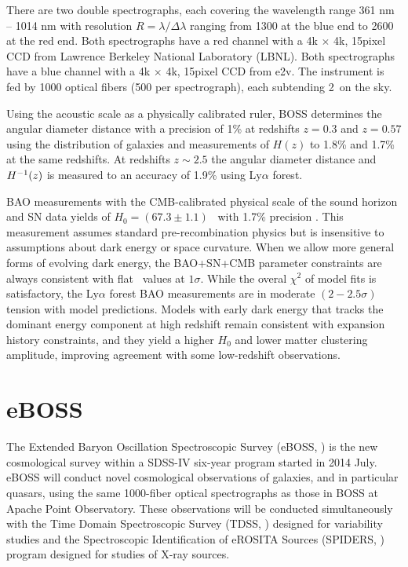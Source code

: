 There are two double spectrographs, each covering the wavelength range 361 nm -- 1014 nm with resolution $R=\lambda/\Delta\lambda$ ranging from 1300 at the blue end to 2600 at the red end.  Both spectrographs have a red channel with a 4k $\times$ 4k, 15\um  pixel CCD from Lawrence Berkeley National Laboratory (LBNL). Both spectrographs have a blue channel with a 4k $\times$ 4k, 15\um  pixel CCD from  e2v. The instrument is fed by 1000 optical fibers (500 per spectrograph), each subtending 2\arcsec\ on the sky.

Using the acoustic scale as a physically calibrated ruler, BOSS determines the angular diameter distance with a precision of 1\% at redshifts $z = 0.3$ and $z = 0.57$ using the distribution of galaxies and measurements of $H(z)$ to 1.8\% and 1.7\%  at the same redshifts. At redshifts $z\sim2.5$ the  angular diameter distance and $H^{-1}(z)$ is measured to an accuracy of 1.9\% using Ly$\alpha$ forest.

BAO measurements with the CMB-calibrated physical scale of the sound horizon and SN data yields of $H_0=(67.3\pm1.1)$ \unith\ with 1.7\% precision \cite{BOSS_results}. This measurement assumes standard pre-recombination physics but is insensitive to assumptions about dark energy or space curvature. When we allow more general forms of evolving dark energy, the BAO+SN+CMB parameter constraints are always consistent with flat \LCDM\ values at $1\sigma$. While the overal $\chi^2$ of model fits is satisfactory, the Ly$\alpha$ forest BAO measurements are in moderate $(2-2.5\sigma)$ tension with model predictions. Models with early dark energy that tracks the dominant energy component at high redshift remain consistent with expansion history constraints, and they yield a higher $H_0$ and lower matter clustering amplitude, improving agreement with some low-redshift observations.

\section{eBOSS}
The Extended Baryon Oscillation Spectroscopic Survey (eBOSS, \cite{2016AJ....151...44D}) is the new cosmological survey within a SDSS-IV six-year program started in 2014 July. eBOSS will conduct novel cosmological observations of galaxies, and in particular quasars, using the same 1000-fiber optical spectrographs as those in BOSS at Apache Point Observatory. These observations will be conducted simultaneously with the Time Domain Spectroscopic Survey (TDSS, \cite{2015ApJ...806..244M}) designed for variability studies and the Spectroscopic Identification of eROSITA Sources (SPIDERS, \cite{2010SPIE.7741E..1NF}) program designed for studies of X-ray sources.

